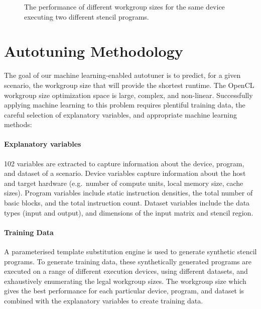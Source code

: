 \documentclass[times, 10pt,twocolumn]{article}
\begin{document}
\begin{figure}
{\begin{minipage}{.48\textwidth}
\begin{subfigure}[h]{.48\columnwidth}
      \vspace{-1.5em} %
      \caption{}
      \label{fig:motivation-4}
    \end{subfigure}
    \caption{%
      The performance of different workgroup sizes for the same device
      executing two different stencil programs.%
    }
    \label{fig:motivation-prog}
  \end{minipage}%
}
\end{figure}


\section{Autotuning Methodology}

The goal of our machine learning-enabled autotuner is to predict, for
a given scenario, the workgroup size that will provide the shortest
runtime.
%
The OpenCL workgroup size optimization space is large, complex, and
non-linear. Successfully applying machine learning to this problem
requires plentiful training data, the careful selection of explanatory
variables, and appropriate machine learning methods:
%
\vspace{-1.2em}
\paragraph{Explanatory variables} 102 variables are extracted to
capture information about the device, program, and dataset of a
scenario. Device variables capture information about the host and
target hardware (e.g.\ number of compute units, local memory size,
cache sizes). Program variables include static instruction densities,
the total number of basic blocks, and the total instruction
count. Dataset variables include the data types (input and output),
and dimensions of the input matrix and stencil region.
%
\vspace{-1.2em}
\paragraph{Training Data} A parameterised template substitution engine
is used to generate synthetic stencil programs. To generate training
data, these synthetically generated programs are executed on a range
of different execution devices, using different datasets, and
exhaustively enumerating the legal workgroup sizes. The workgroup size
which gives the best performance for each particular device, program,
and dataset is combined with the explanatory variables to create
training data.
%
\vspace{-1.2em}
\end{document}
